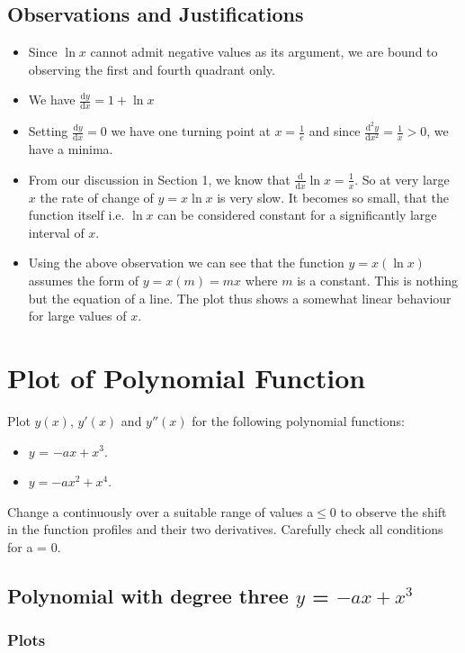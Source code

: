 \documentclass{article}
\begin{document}
\subsection{Observations and Justifications}
\begin{itemize}
    \item Since $\ln{x}$ cannot admit negative values as its argument, we are bound to observing the first and fourth quadrant only.
    \item We have $\frac{\mathrm{d}y}{\mathrm{d}x} = 1+\ln{x}$
    \item Setting $\frac{\mathrm{d}y}{\mathrm{d}x} = 0$ we have one turning point at $x = \frac{1}{e}$ and since $\frac{\mathrm{d^2}y}{\mathrm{d}x^2} = \frac{1}{x} > 0$, we have a minima.
    \item From our discussion in Section 1, we know that $\frac{\mathrm{d}}{\mathrm{d}x} \ln{x} = \frac{1}{x}$. So at very large $x$ the rate of change of $y = x\ln{x}$ is very slow. It becomes so small, that the function itself i.e. $\ln{x}$ can be considered constant for a significantly large interval of $x$.
    \item Using the above observation we can see that the function $y = x(\ln{x})$ assumes the form of $y = x(m) = mx$ where $m$ is a constant. This is nothing but the equation of a line. The plot thus shows a somewhat linear behaviour for large values of $x$.
    
\end{itemize}

\newpage
\section{Plot of Polynomial Function}
Plot $y(x)$, $y'(x)$ and $y''(x)$ for the following polynomial functions:
\begin{itemize}
    \item $y$ = $-ax + x^{3}$.
    \item $y = −ax^{2} + x^{4}$.
\end{itemize}
Change a continuously over a suitable range of values a$\leq$0 to observe the shift in the function profiles and their two derivatives. Carefully check all conditions for a = 0.

\subsection{Polynomial with degree three $y$ = $-ax + x^{3}$}
\subsubsection{Plots}
\end{document}
